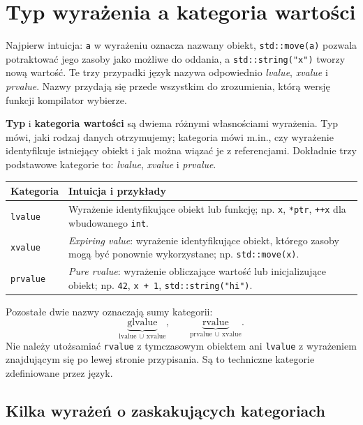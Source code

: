 \section{Typ wyrażenia a kategoria wartości}
\label{sec:move-categories}

Najpierw intuicja: \texttt{a} w wyrażeniu oznacza nazwany obiekt,
\texttt{std::move(a)} pozwala potraktować jego zasoby jako możliwe
do oddania, a \texttt{std::string("x")} tworzy nową wartość.
Te trzy przypadki język nazywa odpowiednio \emph{lvalue},
\emph{xvalue} i \emph{prvalue}. Nazwy przydają się przede wszystkim
do zrozumienia, którą wersję funkcji kompilator wybierze.

\textbf{Typ} i \textbf{kategoria wartości} są dwiema różnymi własnościami
wyrażenia. Typ mówi, jaki rodzaj danych otrzymujemy; kategoria mówi
m.in., czy wyrażenie identyfikuje istniejący obiekt i jak można
wiązać je z referencjami. Dokładnie trzy podstawowe kategorie to:
\emph{lvalue}, \emph{xvalue} i \emph{prvalue}.

\begin{center}
\begin{tabular}{|l|p{10.5cm}|}
\hline
\textbf{Kategoria} & \textbf{Intuicja i przykłady} \\
\hline
\texttt{lvalue} & Wyrażenie identyfikujące obiekt lub funkcję; np. \texttt{x}, \texttt{*ptr}, \texttt{++x} dla wbudowanego \texttt{int}. \\
\hline
\texttt{xvalue} & \emph{Expiring value}: wyrażenie identyfikujące obiekt, którego zasoby mogą być ponownie wykorzystane; np. \texttt{std::move(x)}. \\
\hline
\texttt{prvalue} & \emph{Pure rvalue}: wyrażenie obliczające wartość lub inicjalizujące obiekt; np. \texttt{42}, \texttt{x + 1}, \texttt{std::string("hi")}. \\
\hline
\end{tabular}
\end{center}

Pozostałe dwie nazwy oznaczają sumy kategorii:
\[
\underbrace{\mathrm{glvalue}}_{\mathrm{lvalue}\,\cup\,\mathrm{xvalue}},
\qquad
\underbrace{\mathrm{rvalue}}_{\mathrm{prvalue}\,\cup\,\mathrm{xvalue}}.
\]
Nie należy utożsamiać \texttt{rvalue} z tymczasowym obiektem ani
\texttt{lvalue} z wyrażeniem znajdującym się po lewej stronie przypisania.
Są to techniczne kategorie zdefiniowane przez język.

\subsection{Kilka wyrażeń o zaskakujących kategoriach}


